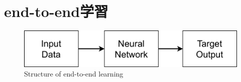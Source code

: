 
\section{end-to-end学習}

\begin{figure}[h]
  \centering
  \includegraphics[keepaspectratio, scale=0.70] {images/RobotGuidance_about_end-to-end.png}
  \caption{Structure of end-to-end learning}
  \label{Fig:about_end-to-end}
\end{figure}

\newpage
